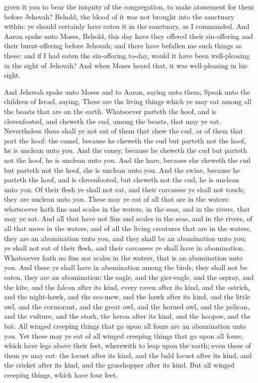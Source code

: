 given it you to bear the iniquity of the congregation, to make atonement for them before Jehovah? Behold, the blood of it was not brought into the sanctuary within: ye should certainly have eaten it in the sanctuary, as I commanded. And Aaron spake unto Moses, Behold, this day have they offered their sin-offering and their burnt-offering before Jehovah; and there have befallen me such things as these: and if I had eaten the sin-offering to-day, would it have been well-pleasing in the sight of Jehovah? And when Moses heard that, it was well-pleasing in his sight. 

And Jehovah spake unto Moses and to Aaron, saying unto them, Speak unto the children of Israel, saying, These are the living things which ye may eat among all the beasts that are on the earth. Whatsoever parteth the hoof, and is clovenfooted, and cheweth the cud, among the beasts, that may ye eat. Nevertheless these shall ye not eat of them that chew the cud, or of them that part the hoof: the camel, because he cheweth the cud but parteth not the hoof, he is unclean unto you. And the coney, because he cheweth the cud but parteth not the hoof, he is unclean unto you. And the hare, because she cheweth the cud but parteth not the hoof, she is unclean unto you. And the swine, because he parteth the hoof, and is clovenfooted, but cheweth not the cud, he is unclean unto you. Of their flesh ye shall not eat, and their carcasses ye shall not touch; they are unclean unto you.  These may ye eat of all that are in the waters: whatsoever hath fins and scales in the waters, in the seas, and in the rivers, that may ye eat. And all that have not fins and scales in the seas, and in the rivers, of all that move in the waters, and of all the living creatures that are in the waters, they are an abomination unto you, and they shall be an abomination unto you; ye shall not eat of their flesh, and their carcasses ye shall have in abomination. Whatsoever hath no fins nor scales in the waters, that is an abomination unto you.  And these ye shall have in abomination among the birds; they shall not be eaten, they are an abomination: the eagle, and the gier-eagle, and the ospray, and the kite, and the falcon after its kind, every raven after its kind, and the ostrich, and the night-hawk, and the sea-mew, and the hawk after its kind, and the little owl, and the cormorant, and the great owl, and the horned owl, and the pelican, and the vulture, and the stork, the heron after its kind, and the hoopoe, and the bat.  All winged creeping things that go upon all fours are an abomination unto you. Yet these may ye eat of all winged creeping things that go upon all fours, which have legs above their feet, wherewith to leap upon the earth; even these of them ye may eat: the locust after its kind, and the bald locust after its kind, and the cricket after its kind, and the grasshopper after its kind. But all winged creeping things, which have four feet, 